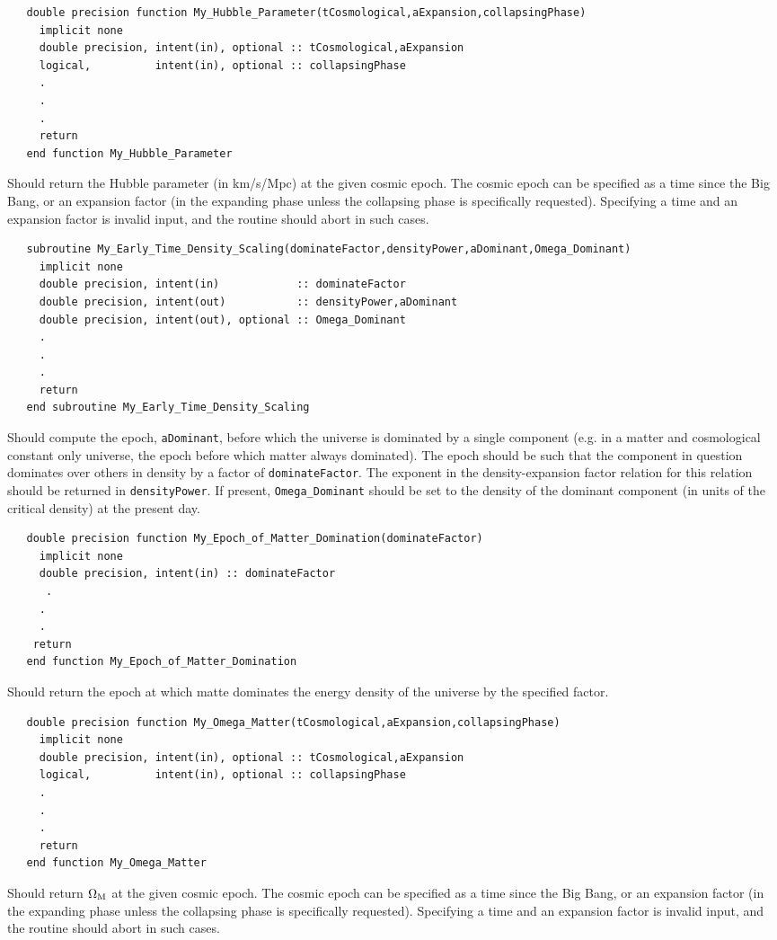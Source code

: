 \begin{verbatim}
   double precision function My_Hubble_Parameter(tCosmological,aExpansion,collapsingPhase)
     implicit none
     double precision, intent(in), optional :: tCosmological,aExpansion
     logical,          intent(in), optional :: collapsingPhase
     .
     .
     .
     return
   end function My_Hubble_Parameter
\end{verbatim}
Should return the Hubble parameter (in km/s/Mpc) at the given cosmic epoch. The cosmic epoch can be specified as a time since the Big Bang, or an expansion factor (in the expanding phase unless the collapsing phase is specifically requested). Specifying a time and an expansion factor is invalid input, and the routine should abort in such cases.

\begin{verbatim}
   subroutine My_Early_Time_Density_Scaling(dominateFactor,densityPower,aDominant,Omega_Dominant)
     implicit none
     double precision, intent(in)            :: dominateFactor
     double precision, intent(out)           :: densityPower,aDominant
     double precision, intent(out), optional :: Omega_Dominant
     .
     .
     .
     return
   end subroutine My_Early_Time_Density_Scaling
\end{verbatim}
Should compute the epoch, {\tt aDominant}, before which the universe is dominated by a single component (e.g. in a matter and cosmological constant only universe, the epoch before which matter always dominated). The epoch should be such that the component in question dominates over others in density by a factor of {\tt dominateFactor}. The exponent in the density-expansion factor relation for this relation should be returned in {\tt densityPower}. If present, {\tt Omega\_Dominant} should be set to the density of the dominant component (in units of the critical density) at the present day.

\begin{verbatim}
   double precision function My_Epoch_of_Matter_Domination(dominateFactor)
     implicit none
     double precision, intent(in) :: dominateFactor
      .
     .
     .
    return
   end function My_Epoch_of_Matter_Domination
\end{verbatim}
Should return the epoch at which matte dominates the energy density of the universe by the specified factor.

\begin{verbatim}
   double precision function My_Omega_Matter(tCosmological,aExpansion,collapsingPhase)
     implicit none
     double precision, intent(in), optional :: tCosmological,aExpansion
     logical,          intent(in), optional :: collapsingPhase
     .
     .
     .
     return
   end function My_Omega_Matter
\end{verbatim}
Should return $\Omega_{\rm M}$ at the given cosmic epoch. The cosmic epoch can be specified as a time since the Big Bang, or an expansion factor (in the expanding phase unless the collapsing phase is specifically requested). Specifying a time and an expansion factor is invalid input, and the routine should abort in such cases.


